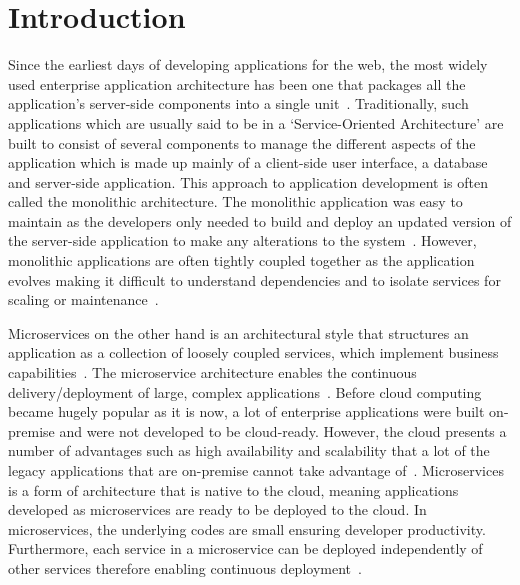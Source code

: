\maketitle


\section{Introduction}

Since the earliest days of developing applications for the web, the
most widely used enterprise application architecture has been one that
packages all the application’s server-side components into a single
unit~\cite{hid-sp18-501-infoq}. Traditionally, such applications which
are usually said to be in a ‘Service-Oriented Architecture’ are built
to consist of several components to manage the different aspects of
the application which is made up mainly of a client-side user
interface, a database and server-side application. This approach to
application development is often called the monolithic
architecture. The monolithic application was easy to maintain as the
developers only needed to build and deploy an updated version of the
server-side application to make any alterations to the
system~\cite{hid-sp18-501-mulesoft}. However, monolithic applications
are often tightly coupled together as the application evolves making
it difficult to understand dependencies and to isolate services for
scaling or maintenance~\cite{hid-sp18-501-trello}.
 
Microservices on the other hand is an architectural style that
structures an application as a collection of loosely coupled services,
which implement business
capabilities~\cite{hid-sp18-501-microservicesio}. The microservice
architecture enables the continuous delivery/deployment of large,
complex applications~\cite{hid-sp18-501-researchgate}. 
Before cloud computing became hugely popular as it
is now, a lot of enterprise applications were built on-premise and
were not developed to be cloud-ready. However, the cloud presents a
number of advantages such as high availability and scalability that a
lot of the legacy applications that are on-premise cannot take
advantage of~\cite{hid-sp18-501-springer}. Microservices is a form of
architecture that is native to the cloud, meaning applications
developed as microservices are ready to be deployed to the cloud. In
microservices, the underlying codes are small ensuring developer
productivity. Furthermore, each service in a microservice can be
deployed independently of other services therefore enabling continuous
deployment~\cite{hid-sp18-501-infoq}.


